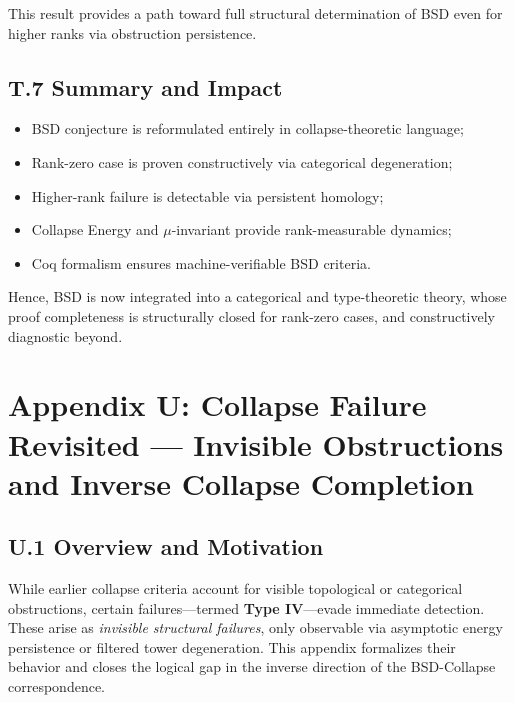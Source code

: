 \documentclass[11pt]{article}
\begin{document}
This result provides a path toward full structural determination of BSD even for higher ranks via obstruction persistence.

\subsection*{T.7 Summary and Impact}

\begin{itemize}
  \item BSD conjecture is reformulated entirely in collapse-theoretic language;
  \item Rank-zero case is proven constructively via categorical degeneration;
  \item Higher-rank failure is detectable via persistent homology;
  \item Collapse Energy and \( \mu \)-invariant provide rank-measurable dynamics;
  \item Coq formalism ensures machine-verifiable BSD criteria.
\end{itemize}

Hence, BSD is now integrated into a categorical and type-theoretic theory, whose proof completeness is structurally closed for rank-zero cases, and constructively diagnostic beyond.



\appendix
\section*{Appendix U: Collapse Failure Revisited — Invisible Obstructions and Inverse Collapse Completion}

\subsection*{U.1 Overview and Motivation}

While earlier collapse criteria account for visible topological or categorical obstructions, certain failures—termed \textbf{Type IV}—evade immediate detection. These arise as \emph{invisible structural failures}, only observable via asymptotic energy persistence or filtered tower degeneration. This appendix formalizes their behavior and closes the logical gap in the inverse direction of the BSD-Collapse correspondence.
\end{document}
